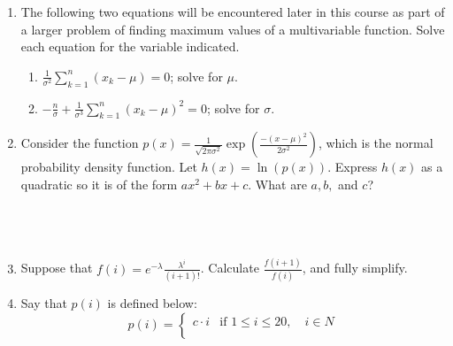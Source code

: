 \documentclass{article}
\begin{document}
\begin{enumerate}
                    \\[$\frac{1}{n}(\sum_{k=1}^{n}x_k^{2}-n\mu^{2})$]
                    \\[$\frac{1}{n}\sum_{k=1}^{n}x_k^{2}-\frac{1}{n}(n\mu^{2})$]
                    \\[$\frac{1}{n}\sum_{k=1}^{n}x_k^{2}-\mu^{2}$]
                    \\[$\frac{1}{n}\sum_{k=1}^n (x_k-\mu)^2 = \frac{1}{n}\sum_{k=1}^n x_k^2-\mu^2$]
                    \item The following two equations will be encountered later in this course as part of a larger problem of finding maximum values of a multivariable function.  Solve each equation for the variable indicated. 
                       \begin{enumerate}
                           \item $ \frac{1}{\sigma^2}\sum_{k=1}^{n}(x_k-\mu)=0$; solve for $\mu$.
                            \\[$\sum_{k=1}^{n}x_k=\sum_{k=1}^{n}\mu$]
                           \item $ -\frac{n}{\sigma}+\frac{1}{\sigma^3}\sum_{k=1}^{n}(x_k-\mu)^2=0$; solve for $\sigma$.
                            \\[$\sigma=\sqrt{\frac{\sum_{k=1}^{n}(x_k-\mu)^{2}}{n}}$]
                       \end{enumerate} 
                    \item Consider the function $ p(x) = \frac{1}{\sqrt{2\pi \sigma^2}}\exp\left( \frac{-(x-\mu)^2}{2\sigma^2}\right)$, which is the normal probability density function.  Let $h(x) = \ln(p(x))$.  Express $h(x)$ as a quadratic so it is of the form $ax^2+bx+c$. What are $a,b,$ and $c$? 
                    \\
                    \\[$a=\frac{1}{2\sigma^{2}}x^2$]
                    \\[$b=\frac{\mu}{2\sigma^{2}}x$]
                    \\[$c=ln(\frac{1}{\sqrt{2\pi\sigma^{2}}})-\frac{\mu^{2}}{2\sigma^{2}}$]
                    \item Suppose that $ f(i)= e^{-\lambda}\frac{\lambda^i}{(i+1)!}$.  Calculate $ \frac{f(i+1)}{f(i)}$, and fully simplify.
                    \item Say that $p(i)$ is defined below:
                        $$ p(i) = \begin{cases} 
                        c\cdot i & \text{if $1 
                        \leq i \leq 20, \quad i \in N$} \\

\end{cases}$$
\end{enumerate}
\end{document}
